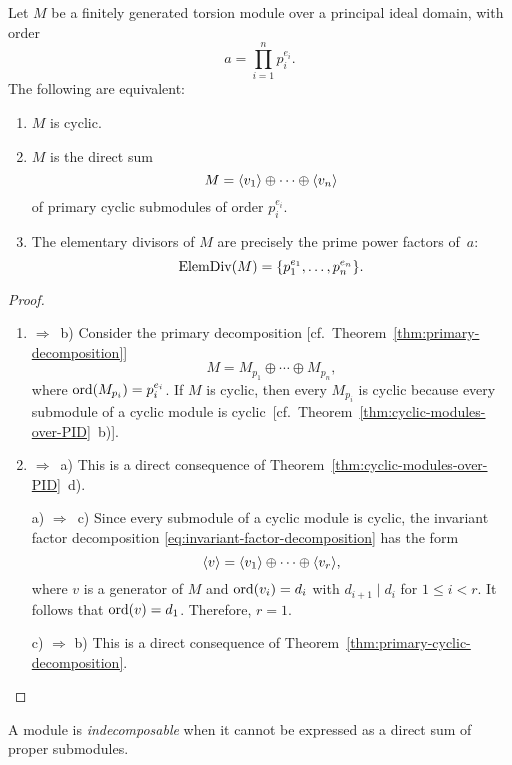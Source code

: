\begin{thm}\label{thm:cyclic-torsion}
    Let\/ $M$ be a finitely generated torsion module over a principal ideal domain, with order  
    $$
        a = \prod_{i=1}^np_i^{e_i}.
    $$
    The following are equivalent:  
    \begin{enumerate}[\rm a)]
        \item $M$ is cyclic.  
        \item $M$ is the direct sum  
        $$
            M = \langle v_1\rangle\oplus\cdots\oplus\langle v_n\rangle
        $$  
        of primary cyclic submodules of order\/ $p_i^{e_i}$.  
        \item The elementary divisors of\/ $M$ are precisely the prime power factors of\/~$a$:
        $$
            \operatorname{ElemDiv}(M) = \{p_1^{e_1},\dots,p_n^{e_n}\}.
        $$
    \end{enumerate}
\end{thm}

\begin{proof}${}$
    \begin{enumerate}[\rm a)]
        \item $\Rightarrow$~b) Consider the primary decomposition [cf.~Theorem~\ref{thm:primary-decomposition}]
        $$
            M = M_{p_1}\oplus\cdots\oplus M_{p_n},
        $$
        where $\operatorname{ord}(M_{p_i})=p_i^{e_i}$. If $M$ is cyclic, then every $M_{p_i}$ is cyclic because every submodule of a cyclic module is cyclic~[cf.~Theorem~\ref{thm:cyclic-modules-over-PID}~b)].

        \item $\Rightarrow$~a) This is a direct consequence of Theorem~\ref{thm:cyclic-modules-over-PID}~d).

        \item[a)] $\Rightarrow$~c) Since every submodule of a cyclic module is cyclic, the invariant factor decomposition \eqref{eq:invariant-factor-decomposition} has the form
        $$
            \langle v\rangle = \langle v_1\rangle\oplus\cdots\oplus\langle v_r\rangle,
        $$
        where $v$ is a generator of $M$ and $\operatorname{ord}(v_i)=d_i$ with $d_{i+1}\mid d_i$ for $1\le i<r$. It follows that $\operatorname{ord}(v)=d_1$. Therefore, $r=1$.

        \item[c)] $\Rightarrow$ b) This is a direct consequence of Theorem~\ref{thm:primary-cyclic-decomposition}.
    \end{enumerate}
\end{proof}


\begin{defn}
    A module is \textsl{indecomposable} when it cannot be expressed as a direct sum of proper submodules.
\end{defn}

